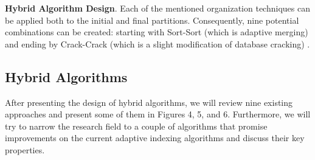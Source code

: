 \documentclass[10pt, conference, compsocconf]{IEEEtran}
\begin{document}
\textbf{Hybrid Algorithm Design}. Each of the mentioned organization techniques can be applied both to the initial and final partitions. Consequently, nine potential combinations can be created: starting with Sort-Sort (which is adaptive merging) and ending by Crack-Crack (which is a slight modification of database cracking) \cite{hybrid}.

\subsection{Hybrid Algorithms}
\label{subsec:hybrid_algo}
After presenting the design of hybrid algorithms, we will review nine existing approaches and present some of them in Figures 4, 5, and 6. Furthermore, we will try to narrow the research field to a couple of algorithms that promise improvements on the current adaptive indexing algorithms and discuss their key properties.
\end{document}
